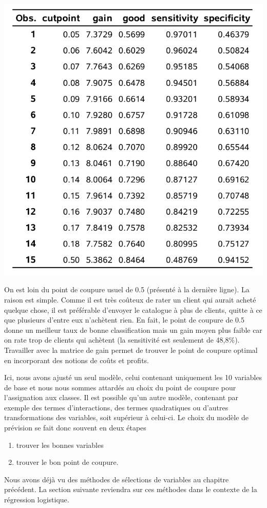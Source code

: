 \documentclass[
  11pt,
  letterpaper,
]{book}
\providecommand{\tightlist}{%
  \setlength{\itemsep}{0pt}\setlength{\parskip}{0pt}}
\theoremstyle{definition}
\theoremstyle{definition}
\theoremstyle{definition}
\theoremstyle{definition}
\theoremstyle{remark}
\begin{document}
\begin{center}\includegraphics[width=0.6\linewidth]{figures/03-logistic-e19} \end{center}

On est loin du point de coupure usuel de 0.5 (présenté à la dernière ligne). La raison est simple. Comme il est très coûteux de rater un client qui aurait acheté quelque chose, il est préférable d'envoyer le catalogue à plus de clients, quitte à ce que plusieurs d'entre eux n'achètent rien. En fait, le point de coupure de 0.5 donne un meilleur taux de bonne classification mais un gain moyen plus faible car on rate trop de clients qui achètent (la sensitivité est seulement de 48,8\%). Travailler avec la matrice de gain permet de trouver le point de coupure optimal en incorporant des notions de coûts et profits.

Ici, nous avons ajusté un seul modèle, celui contenant uniquement les 10 variables de base et nous nous sommes attardés au choix du point de coupure pour l'assignation aux classes. Il est possible qu'un autre modèle, contenant par exemple des termes d'interactions, des termes quadratiques ou d'autres transformations des variables, soit supérieur à celui-ci. Le choix du modèle de prévision se fait donc souvent en deux étapes

\begin{enumerate}
\def\labelenumi{\arabic{enumi}.}
\tightlist
\item
  trouver les bonnes variables
\item
  trouver le bon point de coupure.
\end{enumerate}

Nous avons déjà vu des méthodes de sélections de variables au chapitre précédent. La section suivante reviendra sur ces méthodes dans le contexte de la régression logistique.
\end{document}
